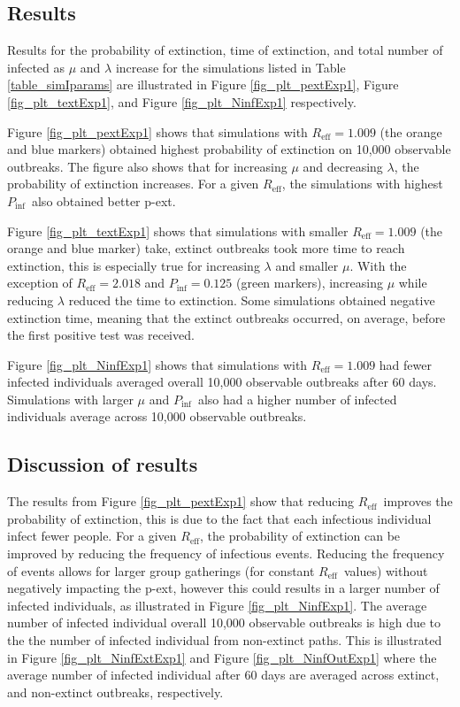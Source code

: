 \documentclass[sr]{drdc-report}
\def\Reff{\ensuremath{R_\mathrm{eff}}}
\def\Pinf{\ensuremath{P_\mathrm{inf}}}
\begin{document}
\subsection{Results}
Results for the probability of extinction, time of extinction, and total number of infected as $\mu$ and $\lambda$ increase for the simulations listed in Table \ref{table_simIparams} are illustrated in Figure \ref{fig_plt_pextExp1}, Figure \ref{fig_plt_textExp1}, and Figure \ref{fig_plt_NinfExp1} respectively.


Figure \ref{fig_plt_pextExp1} shows that simulations with $\Reff = 1.009$ (the orange and blue markers) obtained highest probability of extinction on 10,000 observable outbreaks. The figure also shows that for increasing $\mu$ and decreasing $\lambda$, the probability of extinction increases. For a given \Reff, the simulations with highest \Pinf\ also obtained better p-ext. 


Figure \ref{fig_plt_textExp1} shows that simulations with smaller $\Reff = 1.009$ (the orange and blue marker) take, extinct outbreaks took more time to reach extinction, this is especially true for increasing $\lambda$ and smaller $\mu$. With the exception of $\Reff = 2.018$ and $\Pinf = 0.125$ (green markers), increasing $\mu$ while reducing $\lambda$ reduced the time to extinction. Some simulations obtained negative extinction time, meaning that the extinct outbreaks occurred, on average, before the first positive test was received.  


Figure \ref{fig_plt_NinfExp1} shows that simulations with $\Reff = 1.009$ had fewer infected individuals averaged overall 10,000 observable outbreaks after 60 days. Simulations with larger $\mu$ and \Pinf\ also had a higher number of infected individuals average across 10,000 observable outbreaks. 


\subsection{Discussion of results}
The results from Figure \ref{fig_plt_pextExp1} show that reducing \Reff\ improves the probability of extinction, this is due to the fact that each infectious individual infect fewer people. For a given \Reff, the probability of extinction can be improved by reducing the frequency of infectious events. Reducing the frequency of events allows for larger group gatherings (for constant \Reff\ values) without negatively impacting the p-ext, however this could results in a larger number of infected individuals, as illustrated in Figure \ref{fig_plt_NinfExp1}. The average number of infected individual overall 10,000 observable outbreaks is high due to the the number of infected individual from non-extinct paths. This is illustrated in Figure \ref{fig_plt_NinfExtExp1} and Figure \ref{fig_plt_NinfOutExp1} where the average number of infected individual after 60 days are averaged across extinct, and non-extinct outbreaks, respectively.  
\end{document}
